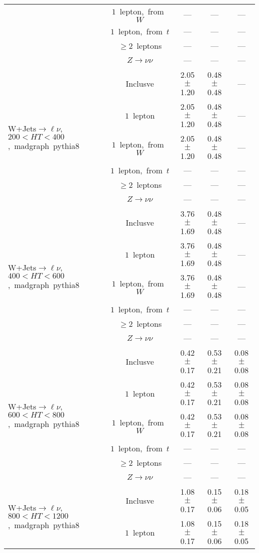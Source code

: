\documentclass{article}
\begin{document}
\begin{longtable}{|l|c|c|c|c|}
 & $1$~lepton,~from~$W$  & ---  & ---  & --- \\* 
 & $1$~lepton,~from~$t$  & ---  & ---  & --- \\* 
 & $\ge2$~leptons  & ---  & ---  & --- \\* 
 & $Z\rightarrow\nu\nu$  & ---  & ---  & --- \\* 
\hline 
\multirow{6}{*}{W+Jets$\rightarrow\ell\nu$,~$200<HT<400$,~madgraph~pythia8} & Inclusve  & 2.05 $\pm$ 1.20  & 0.48 $\pm$ 0.48  & --- \\* 
 & $1$~lepton  & 2.05 $\pm$ 1.20  & 0.48 $\pm$ 0.48  & --- \\* 
 & $1$~lepton,~from~$W$  & 2.05 $\pm$ 1.20  & 0.48 $\pm$ 0.48  & --- \\* 
 & $1$~lepton,~from~$t$  & ---  & ---  & --- \\* 
 & $\ge2$~leptons  & ---  & ---  & --- \\* 
 & $Z\rightarrow\nu\nu$  & ---  & ---  & --- \\* 
\hline 
\multirow{6}{*}{W+Jets$\rightarrow\ell\nu$,~$400<HT<600$,~madgraph~pythia8} & Inclusve  & 3.76 $\pm$ 1.69  & 0.48 $\pm$ 0.48  & --- \\* 
 & $1$~lepton  & 3.76 $\pm$ 1.69  & 0.48 $\pm$ 0.48  & --- \\* 
 & $1$~lepton,~from~$W$  & 3.76 $\pm$ 1.69  & 0.48 $\pm$ 0.48  & --- \\* 
 & $1$~lepton,~from~$t$  & ---  & ---  & --- \\* 
 & $\ge2$~leptons  & ---  & ---  & --- \\* 
 & $Z\rightarrow\nu\nu$  & ---  & ---  & --- \\* 
\hline 
\multirow{6}{*}{W+Jets$\rightarrow\ell\nu$,~$600<HT<800$,~madgraph~pythia8} & Inclusve  & 0.42 $\pm$ 0.17  & 0.53 $\pm$ 0.21  & 0.08 $\pm$ 0.08 \\* 
 & $1$~lepton  & 0.42 $\pm$ 0.17  & 0.53 $\pm$ 0.21  & 0.08 $\pm$ 0.08 \\* 
 & $1$~lepton,~from~$W$  & 0.42 $\pm$ 0.17  & 0.53 $\pm$ 0.21  & 0.08 $\pm$ 0.08 \\* 
 & $1$~lepton,~from~$t$  & ---  & ---  & --- \\* 
 & $\ge2$~leptons  & ---  & ---  & --- \\* 
 & $Z\rightarrow\nu\nu$  & ---  & ---  & --- \\* 
\hline 
\multirow{6}{*}{W+Jets$\rightarrow\ell\nu$,~$800<HT<1200$,~madgraph~pythia8} & Inclusve  & 1.08 $\pm$ 0.17  & 0.15 $\pm$ 0.06  & 0.18 $\pm$ 0.05 \\* 
 & $1$~lepton  & 1.08 $\pm$ 0.17  & 0.15 $\pm$ 0.06  & 0.18 $\pm$ 0.05 \\* 

\end{longtable}
\end{document}

